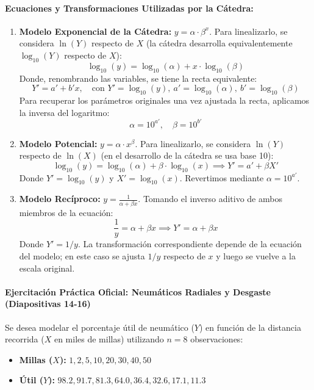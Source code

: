 \documentclass[11pt,letterpaper]{article}
\begin{document}
\paragraph{Ecuaciones y Transformaciones Utilizadas por la Cátedra:}
\begin{enumerate}
    \item \textbf{Modelo Exponencial de la Cátedra:} $y = \alpha \cdot \beta^x$.
    Para linealizarlo, se considera $\ln(Y)$ respecto de $X$ (la cátedra desarrolla equivalentemente $\log_{10}(Y)$ respecto de $X$):
    \begin{equation}
        \log_{10}(y) = \log_{10}(\alpha) + x \cdot \log_{10}(\beta)
    \end{equation}
    Donde, renombrando las variables, se tiene la recta equivalente:
    \begin{equation}
        Y' = a' + b' x, \quad \text{con } Y' = \log_{10}(y), \ a' = \log_{10}(\alpha), \ b' = \log_{10}(\beta)
    \end{equation}
    Para recuperar los parámetros originales una vez ajustada la recta, aplicamos la inversa del logaritmo:
    \begin{equation}
        \alpha = 10^{a'}, \quad \beta = 10^{b'}
    \end{equation}
    
    \item \textbf{Modelo Potencial:} $y = \alpha \cdot x^\beta$.
    Para linealizarlo, se considera $\ln(Y)$ respecto de $\ln(X)$ (en el desarrollo de la cátedra se usa base 10):
    \begin{equation}
        \log_{10}(y) = \log_{10}(\alpha) + \beta \cdot \log_{10}(x) \implies Y' = a' + \beta X'
    \end{equation}
    Donde $Y' = \log_{10}(y)$ y $X' = \log_{10}(x)$. Revertimos mediante $\alpha = 10^{a'}$.
    
    \item \textbf{Modelo Recíproco:} $y = \frac{1}{\alpha + \beta x}$.
    Tomando el inverso aditivo de ambos miembros de la ecuación:
    \begin{equation}
        \frac{1}{y} = \alpha + \beta x \implies Y' = \alpha + \beta x
    \end{equation}
    Donde $Y' = 1/y$. La transformación correspondiente depende de la ecuación del modelo; en este caso se ajusta $1/y$ respecto de $x$ y luego se vuelve a la escala original.
\end{enumerate}

\paragraph{Ejercitación Práctica Oficial: Neumáticos Radiales y Desgaste (Diapositivas 14-16)}
Se desea modelar el porcentaje útil de neumático ($Y$) en función de la distancia recorrida ($X$ en miles de millas) utilizando $n = 8$ observaciones:
\begin{itemize}
    \item \textbf{Millas ($X$):} $1, 2, 5, 10, 20, 30, 40, 50$
    \item \textbf{Útil ($Y$):} $98.2, 91.7, 81.3, 64.0, 36.4, 32.6, 17.1, 11.3$
\end{itemize}
\end{document}
